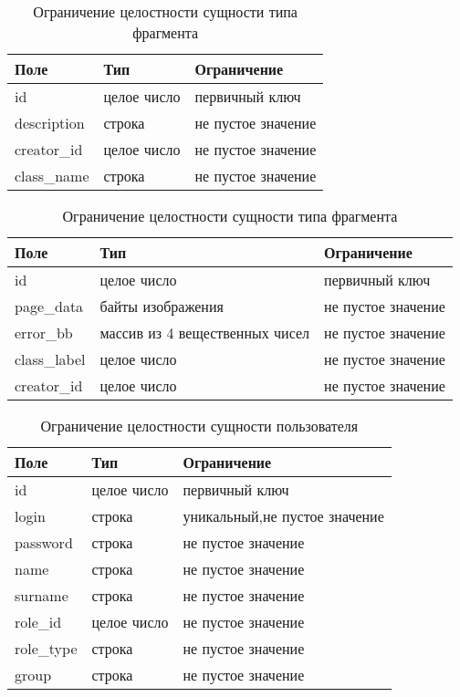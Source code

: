 \begin{table}[htbp]
	\centering
	\begin{tabularx}{\textwidth}{|X|X|X|}
		\hline
		Поле & Тип & Ограничение \\
		\hline
	  	id & целое число & первичный ключ \\
	  	\hline
		description & строка & не пустое значение \\
		\hline
		creator\_id & целое число & не пустое значение\\
		\hline
		class\_name & строка & не пустое значение\\
		\hline
	\end{tabularx}
	\caption{Ограничение целостности сущности типа фрагмента}
	\label{t:markup_type_cons}
\end{table}

\begin{table}[htbp]
	 \centering
	\begin{tabularx}{\textwidth}{|X|X|X|}
		\hline
		Поле & Тип & Ограничение \\
		\hline
		id & целое число & первичный ключ \\
		\hline
		page\_data & байты изображения & не пустое значение\\
		\hline
		error\_bb & массив из 4 вещественных чисел & не пустое значение\\
		\hline
		class\_label & целое число & не пустое значение\\
		\hline
		creator\_id & целое число & не пустое значение\\
		\hline
	\end{tabularx}
	\caption{Ограничение целостности сущности типа фрагмента}
	\label{tab:markups}
\end{table}



\begin{table}[htbp]
	\centering
	\begin{tabularx}{\textwidth}{|X|X|X|}
	\hline
	Поле & Тип & Ограничение \\
	\hline
	id & целое число & первичный ключ\\
	\hline
	login & строка & уникальный,не пустое значение\\
	\hline
	password & строка & не пустое значение\\
	\hline
	name & строка & не пустое значение\\
	\hline
	surname & строка & не пустое значение\\
	\hline
	role\_id & целое число & не пустое значение\\
	\hline
	role\_type & строка & не пустое значение\\
	\hline
	group & строка & не пустое значение\\
	\hline
	\end{tabularx}
	\caption{Ограничение целостности сущности пользователя}
	\label{t:users_cons}
\end{table}




